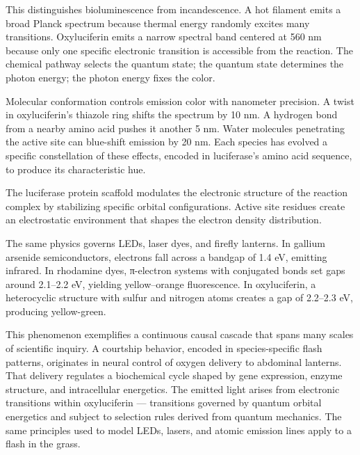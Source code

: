 This distinguishes bioluminescence from incandescence. A hot filament emits a broad Planck spectrum because thermal energy randomly excites many transitions. Oxyluciferin emits a narrow spectral band centered at 560 nm because only one specific electronic transition is accessible from the reaction. The chemical pathway selects the quantum state; the quantum state determines the photon energy; the photon energy fixes the color.

Molecular conformation controls emission color with nanometer precision. A twist in oxyluciferin's thiazole ring shifts the spectrum by 10 nm. A hydrogen bond from a nearby amino acid pushes it another 5 nm. Water molecules penetrating the active site can blue-shift emission by 20 nm. Each species has evolved a specific constellation of these effects, encoded in luciferase's amino acid sequence, to produce its characteristic hue.

The luciferase protein scaffold modulates the electronic structure of the reaction complex by stabilizing specific orbital configurations. Active site residues create an electrostatic environment that shapes the electron density distribution. 

The same physics governs LEDs, laser dyes, and firefly lanterns. In gallium arsenide semiconductors, electrons fall across a bandgap of 1.4 eV, emitting infrared. In rhodamine dyes, π-electron systems with conjugated bonds set gaps around 2.1–2.2 eV, yielding yellow–orange fluorescence. In oxyluciferin, a heterocyclic structure with sulfur and nitrogen atoms creates a gap of 2.2–2.3 eV, producing yellow-green.

This phenomenon exemplifies a continuous causal cascade that spans many scales of scientific inquiry. A courtship behavior, encoded in species-specific flash patterns, originates in neural control of oxygen delivery to abdominal lanterns. That delivery regulates a biochemical cycle shaped by gene expression, enzyme structure, and intracellular energetics. The emitted light arises from electronic transitions within oxyluciferin — transitions governed by quantum orbital energetics and subject to selection rules derived from quantum mechanics. The same principles used to model LEDs, lasers, and atomic emission lines apply to a flash in the grass.

